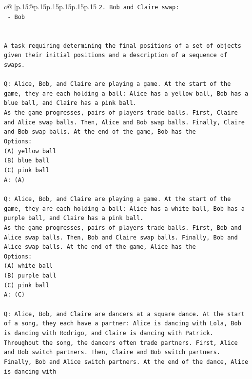 \documentclass{article}
\begin{document}
{\begin{supertabular}{c@{$\;$}|p{.15\linewidth}@{}p{.15\linewidth}p{.15\linewidth}p{.15\linewidth}p{.15\linewidth}p{.15\linewidth}}
{{{\texttt{2. Bob and Claire swap:} \\
\texttt{   {-} Bob} \\
\\ 
\\ 
\texttt{A task requiring determining the final positions of a set of objects given their initial positions and a description of a sequence of swaps.} \\
\\ 
\texttt{Q: Alice, Bob, and Claire are playing a game. At the start of the game, they are each holding a ball: Alice has a yellow ball, Bob has a blue ball, and Claire has a pink ball.} \\
\texttt{As the game progresses, pairs of players trade balls. First, Claire and Alice swap balls. Then, Alice and Bob swap balls. Finally, Claire and Bob swap balls. At the end of the game, Bob has the} \\
\texttt{Options:} \\
\texttt{(A) yellow ball} \\
\texttt{(B) blue ball} \\
\texttt{(C) pink ball} \\
\texttt{A: (A)} \\
\\ 
\texttt{Q: Alice, Bob, and Claire are playing a game. At the start of the game, they are each holding a ball: Alice has a white ball, Bob has a purple ball, and Claire has a pink ball.} \\
\texttt{As the game progresses, pairs of players trade balls. First, Bob and Alice swap balls. Then, Bob and Claire swap balls. Finally, Bob and Alice swap balls. At the end of the game, Alice has the} \\
\texttt{Options:} \\
\texttt{(A) white ball} \\
\texttt{(B) purple ball} \\
\texttt{(C) pink ball} \\
\texttt{A: (C)} \\
\\ 
\texttt{Q: Alice, Bob, and Claire are dancers at a square dance. At the start of a song, they each have a partner: Alice is dancing with Lola, Bob is dancing with Rodrigo, and Claire is dancing with Patrick.} \\
\texttt{Throughout the song, the dancers often trade partners. First, Alice and Bob switch partners. Then, Claire and Bob switch partners. Finally, Bob and Alice switch partners. At the end of the dance, Alice is dancing with} \\
}}}
\end{supertabular}}
\end{document}
